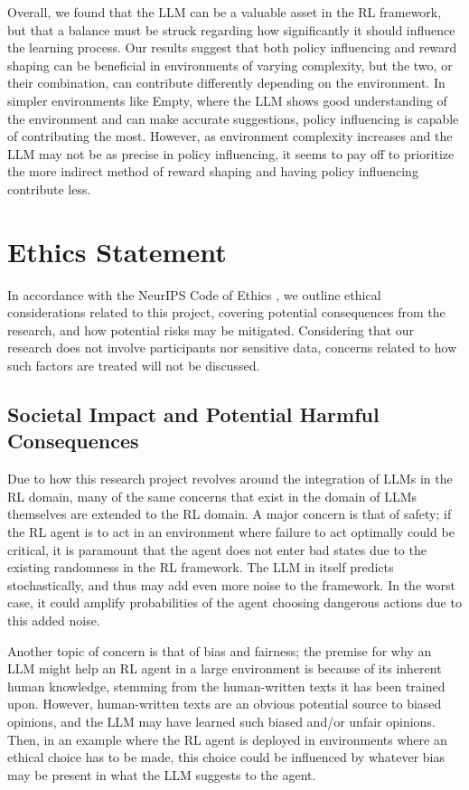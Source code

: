 \documentclass[conference]{IEEEtran}
\begin{document}
Overall, we found that the LLM can be a valuable asset in the RL framework, but that a balance must be struck regarding how significantly it should influence the learning process. Our results suggest that both policy influencing and reward shaping can be beneficial in environments of varying complexity, but the two, or their combination, can contribute differently depending on the environment. In simpler environments like Empty, where the LLM shows good understanding of the environment and can make accurate suggestions, policy influencing is capable of contributing the most. However, as environment complexity increases and the LLM may not be as precise in policy influencing, it seems to pay off to prioritize the more indirect method of reward shaping and having policy influencing contribute less.

\section*{Ethics Statement}

In accordance with the NeurIPS Code of Ethics \cite{ethics}, we outline ethical considerations related to this project, covering potential consequences from the research, and how potential risks may be mitigated. Considering that our research does not involve participants nor sensitive data, concerns related to how such factors are treated will not be discussed.

\subsection{Societal Impact and Potential Harmful Consequences}

Due to how this research project revolves around the integration of LLMs in the RL domain, many of the same concerns that exist in the domain of LLMs themselves are extended to the RL domain. A major concern is that of safety; if the RL agent is to act in an environment where failure to act optimally could be critical, it is paramount that the agent does not enter bad states due to the existing randomness in the RL framework. The LLM in itself predicts stochastically, and thus may add even more noise to the framework. In the worst case, it could amplify probabilities of the agent choosing dangerous actions due to this added noise.

Another topic of concern is that of bias and fairness; the premise for why an LLM might help an RL agent in a large environment is because of its inherent human knowledge, stemming from the human-written texts it has been trained upon. However, human-written texts are an obvious potential source to biased opinions, and the LLM may have learned such biased and/or unfair opinions. Then, in an example where the RL agent is deployed in environments where an ethical choice has to be made, this choice could be influenced by whatever bias may be present in what the LLM suggests to the agent.
\end{document}
